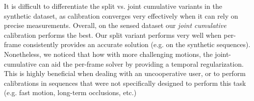 
It is difficult to differentiate the split vs. joint  cumulative variants in the synthetic dataset, as calibration converges very effectively when it can rely on precise measurements. 
Overall, on the sensed dataset our \emph{joint cumulative} calibration performs the best. Our split variant performs very well when per-frame consistently provides an accurate solution (e.g. on the synthetic sequences). Nonetheless, we noticed that how with more challenging motions, the joint-cumulative can aid the per-frame solver by providing a temporal regularization. This is highly beneficial when dealing with an uncooperative user, or to perform calibrations in sequences that were not specifically designed to perform this task (e.g. fast motion, long-term occlusions, etc.)



